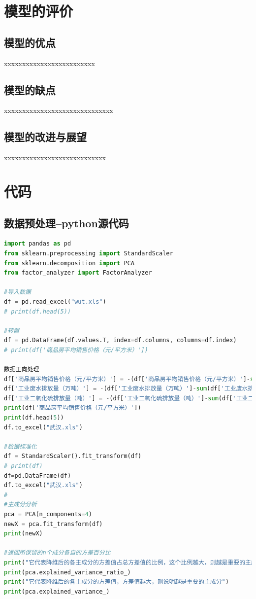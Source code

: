 \documentclass{whutmod}
\begin{document}
	\section{模型的评价}
	\subsection{模型的优点}
xxxxxxxxxxxxxxxxxxxxxxxxx
	
	\subsection{模型的缺点}
xxxxxxxxxxxxxxxxxxxxxxxxxxxxxx


	\subsection{模型的改进与展望}%
xxxxxxxxxxxxxxxxxxxxxxxxxxxx
	\newpage	%
	\nocite{*}		%
	\printbibliography[title = {参考文献}]	%
	
	\newpage
	\appendix %
\section{代码}
\subsection{数据预处理--python源代码}
\begin{lstlisting}[language=python]%这里修改语言
import pandas as pd
from sklearn.preprocessing import StandardScaler
from sklearn.decomposition import PCA
from factor_analyzer import FactorAnalyzer

#导入数据
df = pd.read_excel("wut.xls")
# print(df.head(5))

#转置
df = pd.DataFrame(df.values.T, index=df.columns, columns=df.index)
# print(df['商品房平均销售价格（元/平方米）'])

数据正向处理
df['商品房平均销售价格（元/平方米）'] = -(df['商品房平均销售价格（元/平方米）']-sum(df['商品房平均销售价格（元/平方米）'])/5)
df['工业废水排放量（万吨）'] = -(df['工业废水排放量（万吨）']-sum(df['工业废水排放量（万吨）'])/5)
df['工业二氧化硫排放量（吨）'] = -(df['工业二氧化硫排放量（吨）']-sum(df['工业二氧化硫排放量（吨）'])/5)
print(df['商品房平均销售价格（元/平方米）'])
print(df.head(5))
df.to_excel("武汉.xls")

#数据标准化
df = StandardScaler().fit_transform(df)
# print(df)
df=pd.DataFrame(df)
df.to_excel("武汉.xls")
#
#主成分分析
pca = PCA(n_components=4)
newX = pca.fit_transform(df)
print(newX)

#返回所保留的n个成分各自的方差百分比
print("它代表降维后的各主成分的方差值占总方差值的比例，这个比例越大，则越是重要的主成分")
print(pca.explained_variance_ratio_)
print("它代表降维后的各主成分的方差值，方差值越大，则说明越是重要的主成分")
print(pca.explained_variance_)

\end{lstlisting}
\end{document}
